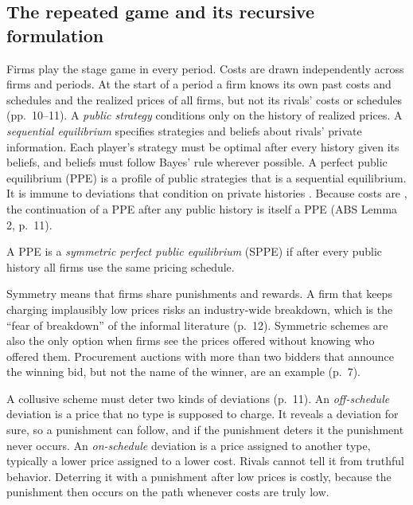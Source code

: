 \subsection{The repeated game and its recursive formulation}\label{sec:12-abs-repeated}

Firms play the stage game in every period. Costs are drawn independently across firms and periods. At the start of
a period a firm knows its own past costs and schedules and the realized prices of all firms, but not its rivals' costs
or schedules (pp.~10--11). A \emph{public strategy} conditions only on the history of realized prices. A
\emph{sequential equilibrium} specifies strategies and beliefs about rivals' private information. Each player's
strategy must be optimal after every history given its beliefs, and beliefs must follow Bayes' rule wherever possible.
A perfect public equilibrium (PPE) is a profile of public strategies that is a sequential equilibrium. It is
immune to deviations that condition on private histories \citep{FudenbergLevineMaskin1994}. Because costs are \iid,
the continuation of a PPE after any public history is itself a PPE (ABS Lemma 2, p.~11).

\begin{definition}\label{def:12-sppe}
A PPE is a \emph{symmetric perfect public equilibrium} (SPPE) if after every public history all firms use the same
pricing schedule.
\end{definition}

Symmetry means that firms share punishments and rewards. A firm that keeps charging implausibly low prices risks an
industry-wide breakdown, which is the ``fear of breakdown'' of the informal literature (p.~12). Symmetric schemes are
also the only option when firms see the prices offered without knowing who offered them. Procurement auctions with
more than two bidders that announce the winning bid, but not the name of the winner, are an example (p.~7).

A collusive scheme must deter two kinds of deviations (p.~11). An \emph{off-schedule} deviation is a price that no
type is supposed to charge. It reveals a deviation for sure, so a punishment can follow, and if the punishment
deters it the punishment never occurs. An \emph{on-schedule} deviation is a price assigned to another type, typically
a lower price assigned to a lower cost. Rivals cannot tell it from truthful behavior. Deterring it with a punishment
after low prices is costly, because the punishment then occurs on the path whenever costs are truly low.

